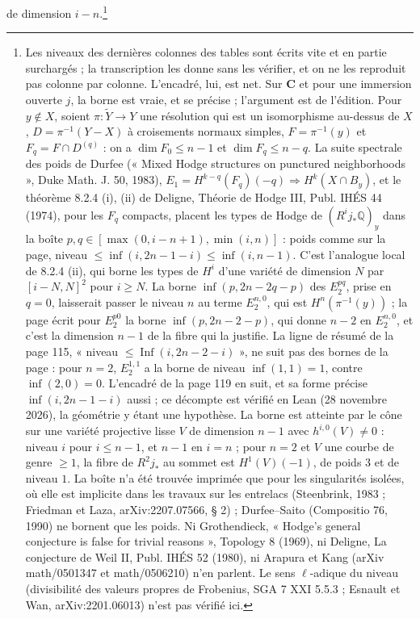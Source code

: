 \documentclass[11pt,a4paper]{article}
\begin{document}
de dimension $i-n$.\footnote{Les niveaux des dernières colonnes des tables sont
écrits vite et en partie surchargés ; la transcription les donne sans les
vérifier, et on ne les reproduit pas colonne par colonne. L'encadré, lui, est net.
Sur $\mathbf{C}$ et pour une immersion ouverte $j$, la borne est vraie, et se
précise ; l'argument est de l'édition. Pour $y \notin X$, soient
$\pi : \tilde Y \to Y$ une résolution qui est un isomorphisme au-dessus de $X$,
$D = \pi^{-1}(Y - X)$ à croisements normaux simples, $F = \pi^{-1}(y)$ et
$F_{q} = F \cap D^{(q)}$ : on a $\dim F_{0} \leqslant n - 1$ et
$\dim F_{q} \leqslant n - q$. La suite spectrale des poids de Durfee (« Mixed
Hodge structures on punctured neighborhoods », Duke Math. J. 50, 1983),
$E_{1} = H^{k-q}(F_{q})(-q) \Rightarrow H^{k}(X \cap B_{y})$, et le
théorème 8.2.4 (i), (ii) de Deligne, Théorie de Hodge III, Publ. IHÉS 44
(1974), pour les $F_{q}$ compacts, placent les types de Hodge de
$(R^{i}j_{*}\mathbb{Q})_{y}$ dans la boîte
$p, q \in [\max(0, i-n+1), \min(i, n)]$ : poids comme sur la page, niveau
$\leqslant \inf(i, 2n-1-i) \leqslant \inf(i, n-1)$. C'est l'analogue local de
8.2.4 (ii), qui borne les types de $H^{i}$ d'une variété de dimension $N$ par
$[i-N, N]^{2}$ pour $i \geqslant N$. La borne $\inf(p, 2n-2q-p)$ des $E_{2}^{pq}$,
prise en $q = 0$, laisserait passer le niveau $n$ au terme $E_{2}^{n,0}$, qui est
$H^{n}(\pi^{-1}(y))$ ; la page écrit pour $E_{2}^{p0}$ la borne
$\inf(p, 2n-2-p)$, qui donne $n-2$ en $E_{2}^{n,0}$, et c'est la dimension $n-1$
de la fibre qui la justifie. La ligne de résumé de la page 115, « niveau
$\leqslant \operatorname{Inf}(i, 2n-2-i)$ », ne suit pas des bornes de la page :
pour $n = 2$, $E_{2}^{1,1}$ a la borne de niveau $\inf(1, 1) = 1$, contre
$\inf(2, 0) = 0$. L'encadré de la page 119 en suit, et sa forme précise
$\inf(i, 2n-1-i)$ aussi ; ce décompte est vérifié en Lean (28 novembre 2026),
la géométrie y étant une hypothèse. La borne est atteinte par le cône sur
une variété projective lisse $V$ de dimension $n-1$ avec
$h^{i,0}(V) \neq 0$ : niveau $i$ pour $i \leqslant n-1$, et $n-1$ en
$i = n$ ; pour $n = 2$ et $V$ une courbe de genre $\geqslant 1$, la fibre de
$R^{2}j_{*}$ au sommet est $H^{1}(V)(-1)$, de poids $3$ et de niveau $1$. La
boîte n'a été trouvée imprimée que pour les singularités isolées, où elle est
implicite dans les travaux sur les entrelacs (Steenbrink, 1983 ; Friedman et
Laza, arXiv:2207.07566, § 2) ; Durfee--Saito (Compositio 76, 1990) ne bornent
que les poids. Ni Grothendieck, « Hodge's general conjecture is false for
trivial reasons », Topology 8 (1969), ni Deligne, La conjecture de Weil II,
Publ. IHÉS 52 (1980), ni Arapura et Kang (arXiv math/0501347 et
math/0506210) n'en parlent. Le sens $\ell$-adique du niveau (divisibilité des
valeurs propres de Frobenius, SGA 7 XXI 5.5.3 ; Esnault et Wan,
arXiv:2201.06013) n'est pas vérifié ici.}
\end{document}
